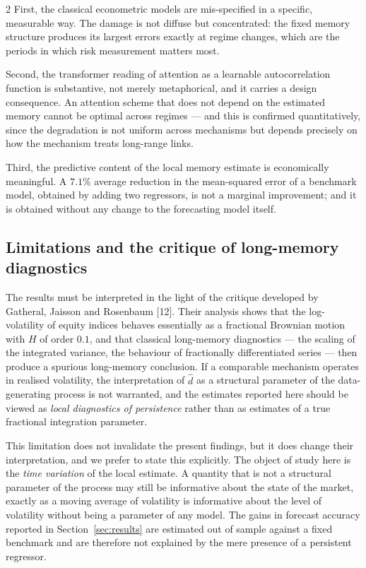 \documentclass[a4paper,10pt,twoside]{article}
\begin{document}
\begin{multicols}{2}
First, the classical econometric models are mis-specified in a specific, measurable way. The
damage is not diffuse but concentrated: the fixed memory structure produces its largest errors
exactly at regime changes, which are the periods in which risk measurement matters most.

Second, the transformer reading of attention as a learnable autocorrelation function is
substantive, not merely metaphorical, and it carries a design consequence. An attention scheme that
does not depend on the estimated memory cannot be optimal across regimes --- and this is
confirmed quantitatively, since the degradation is not uniform across mechanisms but depends
precisely on how the mechanism treats long-range links.

Third, the predictive content of the local memory estimate is economically meaningful. A
$7.1\%$ average reduction in the mean-squared error of a benchmark model, obtained by adding two
regressors, is not a marginal improvement; and it is obtained without any change to the
forecasting model itself.

\subsection{Limitations and the critique of long-memory diagnostics}

The results must be interpreted in the light of the critique developed by Gatheral, Jaisson and
Rosenbaum [12]. Their analysis shows that the log-volatility of equity indices
behaves essentially as a fractional Brownian motion with $H$ of order $0.1$, and that classical
long-memory diagnostics --- the scaling of the integrated variance, the behaviour of
fractionally differentiated series --- then produce a spurious long-memory conclusion. If a
comparable mechanism operates in realised volatility, the interpretation of $\hat d$ as a
structural parameter of the data-generating process is not warranted, and the estimates reported
here should be viewed as \emph{local diagnostics of persistence} rather than as estimates of a
true fractional integration parameter.

This limitation does not invalidate the present findings, but it does change their interpretation,
and we prefer to state this explicitly. The object of study here is the \emph{time variation} of
the local estimate. A quantity that is not a structural parameter of the process may still be
informative about the state of the market, exactly as a moving average of volatility is
informative about the level of volatility without being a parameter of any model. The gains in
forecast accuracy reported in Section~\ref{sec:results} are estimated out of sample against a
fixed benchmark and are therefore not explained by the mere presence of a persistent regressor.


\end{multicols}
\end{document}
